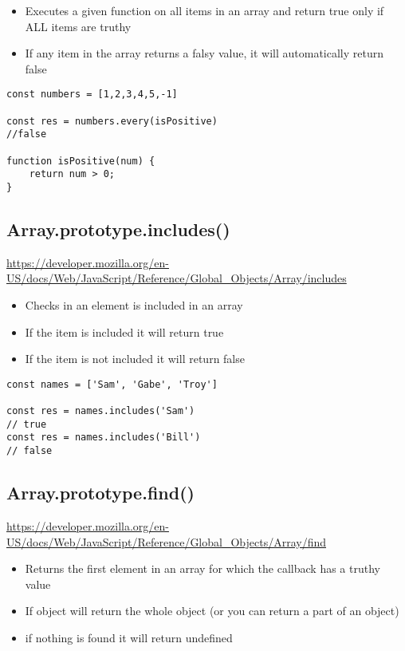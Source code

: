 \documentclass[10pt]{article}
\begin{document}
\begin{itemize}
	\item Executes a given function on all items in an array and return true only if ALL items are truthy
	\item If any item in the array returns a falsy value, it will automatically return false
\end{itemize}

\begin{lstlisting}[title=Example every(), captionpos=t]
const numbers = [1,2,3,4,5,-1]

const res = numbers.every(isPositive)
//false

function isPositive(num) {
    return num > 0;
}
\end{lstlisting}
\medskip %




\medskip %
\pagebreak
\subsection{Array.prototype.includes()}

\url{https://developer.mozilla.org/en-US/docs/Web/JavaScript/Reference/Global_Objects/Array/includes}

\begin{itemize}
	\item Checks in an element is included in an array
	\item If the item is included it will return true
	\item If the item is not included it will return false
\end{itemize}

\begin{lstlisting}[title=Example includes(), captionpos=t]
const names = ['Sam', 'Gabe', 'Troy']

const res = names.includes('Sam')
// true
const res = names.includes('Bill')
// false
\end{lstlisting}
\medskip %


\medskip %
\pagebreak
\subsection{Array.prototype.find()}

\url{https://developer.mozilla.org/en-US/docs/Web/JavaScript/Reference/Global_Objects/Array/find}

\begin{itemize}
	\item Returns the first element in an array for which the callback has a truthy value
	\item If object will return the whole object (or you can return a part of an object)
	\item if nothing is found it will return undefined
\end{itemize}
\end{document}
